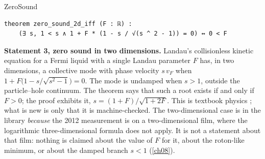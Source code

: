 \begin{leanbox}[title={Lean 4 \enspace Statement 3 \enspace ZeroSound}]{ZeroSound}
\begin{lstlisting}[style=lean]
theorem zero_sound_2d_iff (F : ℝ) :
    (∃ s, 1 < s ∧ 1 + F * (1 - s / √(s ^ 2 - 1)) = 0) ↔ 0 < F
\end{lstlisting}
\end{leanbox}
\textbf{Statement 3, zero sound in two dimensions.} Landau's collisionless kinetic equation for a Fermi liquid with a single Landau parameter $F$ has, in two dimensions, a collective mode with phase velocity $s\,v_F$ when $1+F\bigl(1-s/\sqrt{s^2-1}\bigr)=0$. The mode is undamped when $s>1$, outside the particle--hole continuum. The theorem says that such a root exists if and only if $F>0$; the proof exhibits it, $s=(1+F)/\sqrt{1+2F}$. This is textbook physics \cite{BaymPethick1991}; what is new is only that it is machine-checked. The two-dimensional case is in the library \emph{because} the 2012 measurement is on a two-dimensional film, where the logarithmic three-dimensional formula does not apply. It is not a statement about that film: nothing is claimed about the value of $F$ for it, about the roton-like minimum, or about the damped branch $s<1$ (\cref{ch08}).


